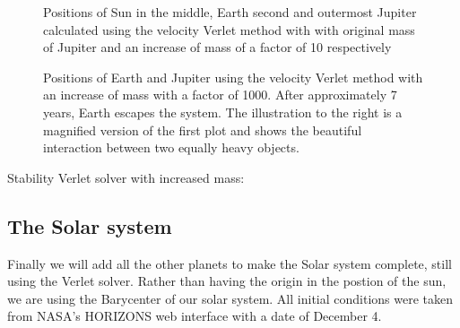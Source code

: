 \documentclass[../main.tex]{subfiles}
\begin{document}
\begin{figure}[!h]
  \centering
  \caption{Positions of Sun in the middle, Earth second and outermost Jupiter calculated using the velocity Verlet method with with original mass of Jupiter and an increase of mass of a factor of 10 respectively}
  \label{fig:SunEarthJupiter10}
\end{figure}

\begin{figure}[!h]
  \centering
  \caption{Positions of Earth and Jupiter using the velocity Verlet method with an increase of mass with a factor of 1000. After approximately 7 years, Earth escapes the system. The illustration to the right is a magnified version of the first plot and shows the beautiful interaction between two equally heavy objects.}
  \label{fig:SunEarthJupiter10000}
\end{figure}
\FloatBarrier
Stability Verlet solver with increased mass:



\subsection{The Solar system} \label{sec:results-entire-solar-system}
Finally we will add all the other planets to make the Solar system complete, still using the Verlet solver. Rather than having the origin in the postion of the sun, we are using the Barycenter of our solar system. All initial conditions were taken from NASA's HORIZONS web interface\cite{HorizonsNASA} with a date of December 4.
\end{document}
